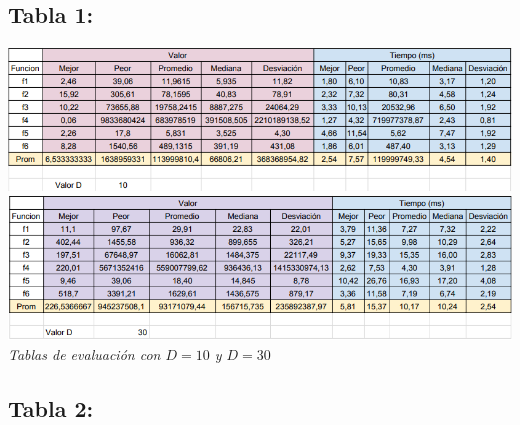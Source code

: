 \documentclass[10pt]{article}
\begin{document}
\subsection{Tabla 1:}
\begin{center}
  \includegraphics[scale=0.5]{imgs/10-1.png}\\
  \includegraphics[scale=0.5]{imgs/30-1.png}
  \\\textit{Tablas de evaluación con $D=10$ y $D=30$}
\end{center}
\subsection{Tabla 2:}
\end{document}
